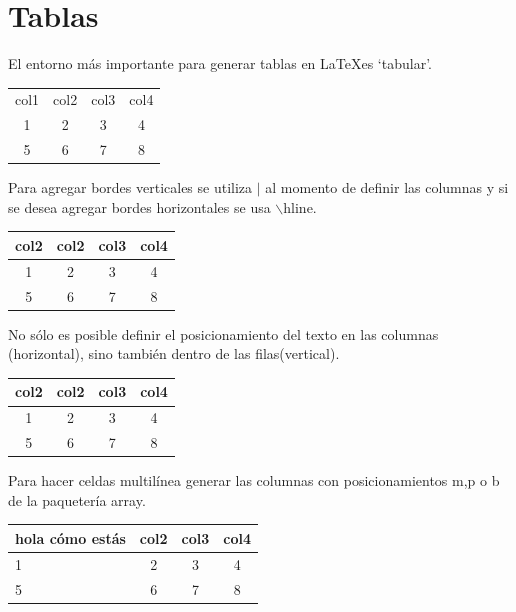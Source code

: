 \documentclass[]{article}
\begin{document}
\lipsum[1-3]

\section{Tablas}

El entorno más importante para generar tablas en \LaTeX es `tabular'.

\begin{tabular}{cccc}%
	col1 & col2 & col3 & col4\\
	1	&	2	&	3	&	4\\
	5	&	6	&	7	&	8\\
\end{tabular}

Para agregar bordes verticales se utiliza $|$ al momento de definir las columnas y si se desea agregar bordes horizontales se usa $\backslash$hline.

\begin{tabular}{|cccc|}%
	\hline 
	col2 & col2 & col3 & col4\\
	\hline
	1	&	2	&	3	&	4\\
	5	&	6	&	7	&	8\\
	\hline
\end{tabular}

No sólo es posible definir el posicionamiento del texto en las columnas (horizontal), sino también dentro de las filas(vertical).

\begin{tabular}[c]{|cccc|}%
	\hline 
	col2 & col2 & col3 & col4\\ [1cm]
	\hline
	1	&	2	&	3	&	4\\
	5	&	6	&	7	&	8\\
	\hline
\end{tabular}

Para hacer celdas multilínea generar las columnas con posicionamientos m,p o b de la paquetería array.

\begin{tabular}{|b{1cm} ccc|}%
	\hline 
	hola cómo estás & col2 & col3 & col4\\ 
	\hline
	1	&	2	&	3	&	4\\
	5	&	6	&	7	&	8\\
	\hline
\end{tabular}
\end{document}
